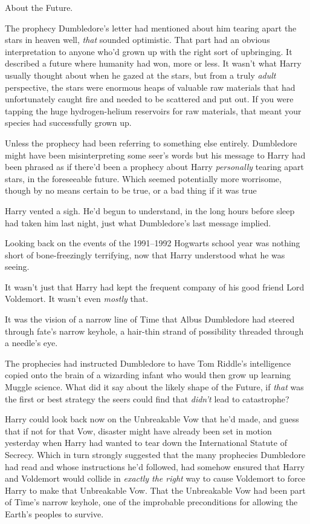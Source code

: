 About the Future.

The prophecy Dumbledore's letter had mentioned about him tearing apart the
stars in heaven{\el} well, \emph{that} sounded optimistic. That part had an
obvious interpretation to anyone who'd grown up with the right sort of
upbringing. It described a future where humanity had won, more or less. It
wasn't what Harry usually thought about when he gazed at the stars, but from a
truly \emph{adult} perspective, the stars were enormous heaps of valuable raw
materials that had unfortunately caught fire and needed to be scattered and put
out. If you were tapping the huge hydrogen-helium reservoirs for raw materials,
that meant your species had successfully grown up.

Unless the prophecy had been referring to something else entirely. Dumbledore
might have been misinterpreting some seer's words{\el} but his message to
Harry had been phrased as if there'd been a prophecy about Harry
\emph{personally} tearing apart stars, in the foreseeable future. Which seemed
potentially more worrisome, though by no means certain to be true, or a bad
thing if it was true{\el}

Harry vented a sigh. He'd begun to understand, in the long hours before sleep
had taken him last night, just what Dumbledore's last message implied.

Looking back on the events of the 1991–1992 Hogwarts school year was nothing
short of bone-freezingly terrifying, now that Harry understood what he was
seeing.

It wasn't just that Harry had kept the frequent company of his good friend Lord
Voldemort. It wasn't even \emph{mostly} that.

It was the vision of a narrow line of Time that Albus Dumbledore had steered
through fate's narrow keyhole, a hair-thin strand of possibility threaded
through a needle's eye.

The prophecies had instructed Dumbledore to have Tom Riddle's intelligence
copied onto the brain of a wizarding infant who would then grow up learning
Muggle science. What did it say about the likely shape of the Future, if
\emph{that} was the first or best strategy the seers could find that
\emph{didn't} lead to catastrophe?

Harry could look back now on the Unbreakable Vow that he'd made, and guess that
if not for that Vow, disaster might have already been set in motion yesterday
when Harry had wanted to tear down the International Statute of Secrecy. Which
in turn strongly suggested that the many prophecies Dumbledore had read and
whose instructions he'd followed, had somehow ensured that Harry and Voldemort
would collide in \emph{exactly the right} way to cause Voldemort to force Harry
to make that Unbreakable Vow. That the Unbreakable Vow had been part of Time's
narrow keyhole, one of the improbable preconditions for allowing the Earth's
peoples to survive.

